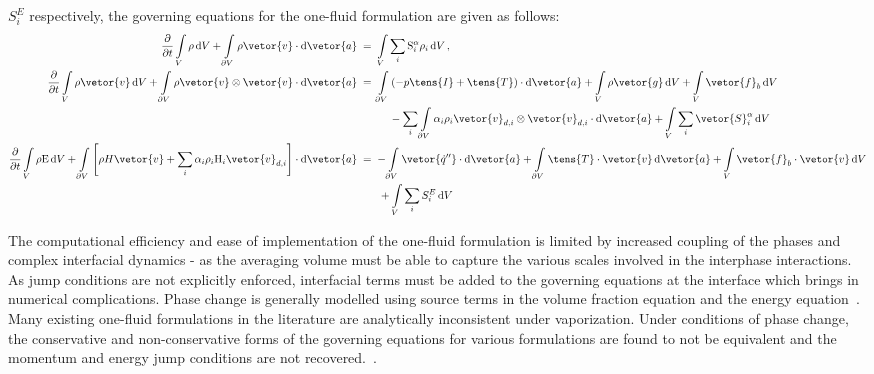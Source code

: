  $S_{i}^{E}$ respectively, the governing equations for the one-fluid formulation are given 
 as follows: 
\begin{subequations}\label{eq_vof_mass}
\begin{align}
\frac{\partial}{\partial t}\int\limits_{V} \rho\,\mathrm{d}V +
\int\limits_{\partial V} \rho \vetor{v} \cdot \mathrm{d}\vetor{a}
&\;=\; \int\limits_{V} \sum_{i}\mathrm{S}^{\alpha}_{i} \rho_{i}\,\mathrm{d}V\,,\\
%
\frac{\partial}{\partial t}\int\limits_{V} \rho \vetor{v}\,\mathrm{d}V +
\int\limits_{\partial V} \rho\vetor{v} \otimes \vetor{v} \cdot \mathrm{d}\vetor{a}
&\;=\; \int\limits_{\partial V} \left(-p \tens{I} + \tens{T}\right)\cdot\mathrm{d}\vetor{a} + \int\limits_{V} \rho \vetor{g}\,\mathrm{d}V
 + \int\limits_{V} \vetor{f}_{b}\,\mathrm{d}V \nonumber\\
&\qquad\quad{} - \sum_{i}\int\limits_{\partial V} \alpha_{i} \rho_{i} \vetor{v}_{d,i} \otimes \vetor{v}_{d,i} \cdot\mathrm{d}\vetor{a}
 + \int\limits_{V} \sum_{i}\vetor{S}^{\alpha}_{i}\,\mathrm{d}V\,\\
%
\frac{\partial}{\partial t}\int\limits_{V}\rho \mathrm{E}\,\mathrm{d}V +
\int\limits_{\partial V} \left[\rho H \vetor{v} + \sum_{i}\alpha_{i} \rho_{i} \mathrm{H}_{i} \vetor{v}_{d,i}\right] \cdot \mathrm{d}\vetor{a}
&\;=\; - \int\limits_{\partial V} \vetor{\dot{q}''}  \cdot \mathrm{d}\vetor{a} + \int\limits_{\partial V} \tens{T}\cdot\vetor{v}\,\mathrm{d}\vetor{a}
 + \int\limits_{V}\vetor{f}_{b}\cdot\vetor{v}\,\mathrm{d}V\nonumber\\
&\qquad{} + \int\limits_{V} \sum_{i} S_{i}^{E}\,\mathrm{d}V
\end{align}
\end{subequations}

The computational efficiency and ease of implementation of the one-fluid formulation is limited by increased coupling of the 
 phases and complex interfacial dynamics - as the averaging volume must be 
 able to capture the various scales involved in the interphase interactions. As jump conditions are not explicitly enforced, interfacial terms must be added 
 to the governing equations at the interface which brings in numerical complications. Phase
 change is generally modelled using source terms in the volume fraction equation and the energy equation~\cite{hardtEvaporationModelInterfacial2008,tryggvasonDirectNumericalSimulations2011}.
 Many existing one-fluid formulations 
 in the literature are analytically inconsistent under vaporization. Under conditions of phase change, 
 the conservative and non-conservative forms of the governing equations for various formulations are found to not be equivalent 
 and the momentum and energy jump conditions are not recovered.~\cite{trujilloReexaminingOnefluidFormulation2021}. 

